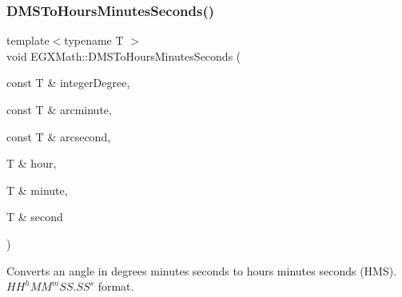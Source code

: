 \subsubsection{\texorpdfstring{D\+M\+S\+To\+Hours\+Minutes\+Seconds()}{DMSToHoursMinutesSeconds()}}
{\footnotesize\ttfamily template$<$typename T $>$ \\
void E\+G\+X\+Math\+::\+D\+M\+S\+To\+Hours\+Minutes\+Seconds (\begin{DoxyParamCaption}\item[{const T \&}]{integer\+Degree,  }\item[{const T \&}]{arcminute,  }\item[{const T \&}]{arcsecond,  }\item[{T \&}]{hour,  }\item[{T \&}]{minute,  }\item[{T \&}]{second }\end{DoxyParamCaption})}



Converts an angle in degrees minutes seconds to hours minutes seconds (H\+MS). ${HH}^h{MM}^m{SS.SS}^s$ format. 

